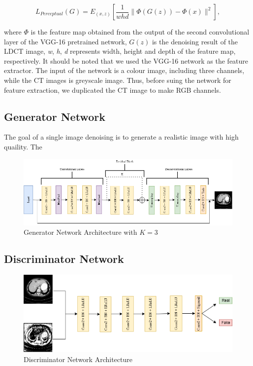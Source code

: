 \documentclass[journal]{IEEEtran}
\begin{document}
\begin{equation}
	L_{Perceptual}(G) = E_{(x,z)}\left[ \frac{1}{whd}\|\Phi(G(z))-\Phi(x)\|^2 \right],
\end{equation}

	where $\Phi$ is the feature map obtained from the output of the second convolutional layer of the VGG-16 pretrained network, $G(z)$ is the denoising result of the LDCT image, \emph{w}, \emph{h}, \emph{d} represents width, height and depth of the feature map, respectively.  It should be noted that we used the VGG-16 network as the feature extractor.  The input of the network is a colour image, including three channels, while the CT images is greyscale image.  Thus, before suing the network for feature extraction, we duplicated the CT image to make RGB channels.

\subsection{Generator Network}
\label{generator}
The goal of a single image denoising is to generate a realistic image with high quaility.  The 


\begin{figure}[!th]
    \centering
    \includegraphics[width=15cm]{generator}
    \caption{Generator Network Architecture with $K=3$}
    \label{generator}
\end{figure}

\subsection{Discriminator Network}
\label{discriminator}

\begin{figure}[!th]
    \centering
    \includegraphics[width=15cm]{discriminator}
    \caption{Discriminator Network Architecture}
    \label{discriminator}
\end{figure}
\end{document}

